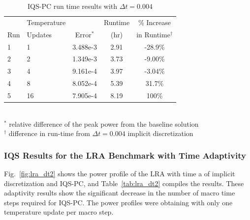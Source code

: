 \documentclass{elsarticle}
\newcommand{\fig}[1]{Fig.~\ref{#1}}                      %
\newcommand{\tbl}[1]{Table~\ref{#1}}                     %
\newcommand{\iqspc}{IQS-PC\xspace}
\begin{document}
\begin{table}[!htbp]
\begin{center}
\caption{\iqspc run time results with $\Delta t = 0.004$}
\label{tab:iqspc_lra}
\begin{tabular}{|l|l|ccc|}
\hline
	&  Temperature 	&  		& Runtime 	& \% Increase	\\
Run	&  Updates 	& Error$^*$ & (hr)		& in Runtime$^{\dagger}$\\
\hline
1	& 1		& 3.488e-3 	& 2.91 	& -28.9\%	\\
2	& 2		& 1.349e-3 	& 3.73	& -9.00\%	\\
\rowcolor{yellow} 3 	& 4 	& 9.161e-4 	& 3.97	& -3.04\%	\\
4 	& 8 	& 8.052e-4 	& 5.39	&  31.7\%	\\
5 	& 16	& 7.905e-4 	& 8.19	&  100\%	\\
\hline
\end{tabular}
\\
\footnotesize{$^*$ relative difference of the peak power from the baseline solution}\\
\footnotesize{$^{\dagger}$ difference in run-time from $\Delta t = 0.004$ implicit discretization} 
\end{center}
\end{table}


\subsubsection{IQS Results for the LRA Benchmark with Time Adaptivity}

\fig{fig:lra_dt2} shows the power profile of the LRA with time a of implicit discretization and \iqspc, and \tbl{tab:lra_dt2} compiles the results. These adaptivity results show the significant decrease in the number of macro time steps required for \iqspc. The power profiles were obtaining with only one temperature update per macro step.
\end{document}

